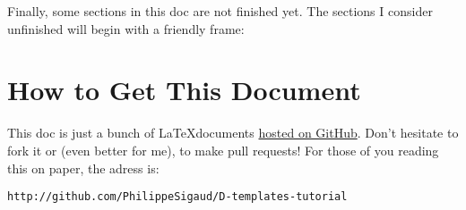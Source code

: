 
Finally, some sections in this doc are not finished yet. The sections I consider unfinished will begin with a friendly frame:


\section*{How to Get This Document}

This doc is just a bunch of \LaTeX documents \href{http://github.com/PhilippeSigaud/D-templates-tutorial}{hosted on GitHub}. Don't hesitate to fork it or (even better for me), to make pull requests! For those of you reading this on paper, the adress is:

{\color{darkblue}\texttt{http://github.com/PhilippeSigaud/D-templates-tutorial}} 

